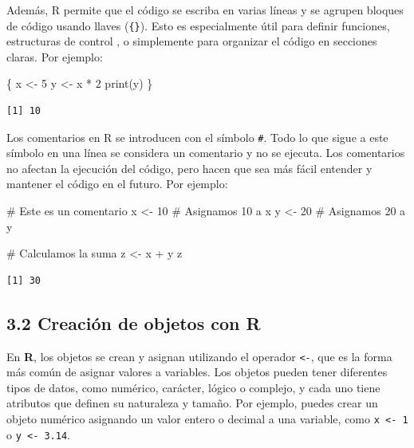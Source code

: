 \documentclass[
  letterpaper,
  DIV=11,
  numbers=noendperiod]{scrreprt}
\newenvironment{Shaded}{\begin{snugshade}}{\end{snugshade}}
\newcommand{\CommentTok}[1]{\textcolor[rgb]{0.37,0.37,0.37}{#1}}
\newcommand{\DecValTok}[1]{\textcolor[rgb]{0.68,0.00,0.00}{#1}}
\newcommand{\FunctionTok}[1]{\textcolor[rgb]{0.28,0.35,0.67}{#1}}
\newcommand{\NormalTok}[1]{\textcolor[rgb]{0.00,0.23,0.31}{#1}}
\newcommand{\OtherTok}[1]{\textcolor[rgb]{0.00,0.23,0.31}{#1}}
\newcommand{\SpecialCharTok}[1]{\textcolor[rgb]{0.37,0.37,0.37}{#1}}
\begin{document}
Además, R permite que el código se escriba en varias líneas y se agrupen
bloques de código usando llaves (\texttt{\{\}}). Esto es especialmente
útil para definir funciones, estructuras de control , o simplemente para
organizar el código en secciones claras. Por ejemplo:

\begin{Shaded}
\begin{Highlighting}[]
\NormalTok{\{}
\NormalTok{  x }\OtherTok{\textless{}{-}} \DecValTok{5}
\NormalTok{  y }\OtherTok{\textless{}{-}}\NormalTok{ x }\SpecialCharTok{*} \DecValTok{2}
  \FunctionTok{print}\NormalTok{(y)}
\NormalTok{\}}
\end{Highlighting}
\end{Shaded}

\begin{verbatim}
[1] 10
\end{verbatim}

Los comentarios en R se introducen con el símbolo \texttt{\#}. Todo lo
que sigue a este símbolo en una línea se considera un comentario y no se
ejecuta. Los comentarios no afectan la ejecución del código, pero hacen
que sea más fácil entender y mantener el código en el futuro. Por
ejemplo:

\begin{Shaded}
\begin{Highlighting}[]
\CommentTok{\# Este es un comentario}
\NormalTok{x }\OtherTok{\textless{}{-}} \DecValTok{10}  \CommentTok{\# Asignamos 10 a x}
\NormalTok{y }\OtherTok{\textless{}{-}} \DecValTok{20}  \CommentTok{\# Asignamos 20 a y}

\CommentTok{\# Calculamos la suma}
\NormalTok{z }\OtherTok{\textless{}{-}}\NormalTok{ x }\SpecialCharTok{+}\NormalTok{ y}
\NormalTok{z}
\end{Highlighting}
\end{Shaded}

\begin{verbatim}
[1] 30
\end{verbatim}

\hypertarget{creaciuxf3n-de-objetos-con-r}{%
\subsection{3.2 Creación de objetos con
R}\label{creaciuxf3n-de-objetos-con-r}}

En \textbf{R}, los objetos se crean y asignan utilizando el operador
\texttt{\textless{}-}, que es la forma más común de asignar valores a
variables. Los objetos pueden tener diferentes tipos de datos, como
numérico, carácter, lógico o complejo, y cada uno tiene atributos que
definen su naturaleza y tamaño. Por ejemplo, puedes crear un objeto
numérico asignando un valor entero o decimal a una variable, como
\texttt{x\ \textless{}-\ 1} o \texttt{y\ \textless{}-\ 3.14}.
\end{document}
